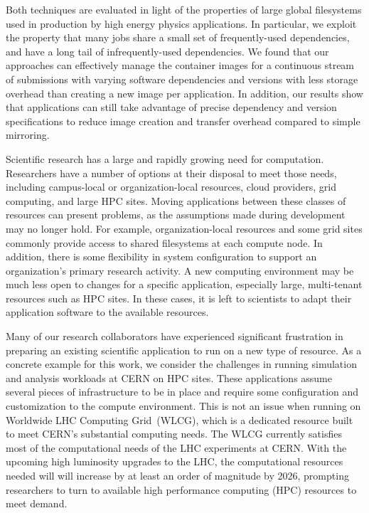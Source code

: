 \documentclass[sigconf]{acmart}
\begin{document}
Both techniques are evaluated in light of the properties
of large global filesystems used in production by high
energy physics applications.  In particular, we exploit the
property that many jobs share a small set of frequently-used
dependencies, and have a long tail of infrequently-used dependencies.
We found that our approaches can effectively manage the container images for a continuous stream of submissions with varying software dependencies and versions with less storage overhead than creating a new image per application.
In addition, our results show that applications can still take advantage of precise dependency and version specifications to reduce image creation and transfer overhead compared to simple mirroring.


Scientific research has a large and rapidly growing need for computation.
Researchers have a number of options at their disposal to meet those needs,
including campus-local or organization-local resources,
cloud providers,
grid computing,
and large HPC sites.
Moving applications between these classes of resources can present problems,
as the assumptions made during development may no longer hold.
For example, organization-local resources and some grid sites commonly provide access to shared filesystems at each compute node.
In addition, there is some flexibility in system configuration to support an organization's primary research activity.
A new computing environment may be much less open to changes for a specific application,
especially large, multi-tenant resources such as HPC sites.
In these cases, it is left to scientists to adapt their application software to the available resources.

Many of our research collaborators have experienced significant frustration in preparing an existing scientific application to run on a new type of resource.
As a concrete example for this work,
we consider the challenges in running simulation and analysis workloads at CERN on HPC sites.
These applications assume several pieces of infrastructure to be in place and require some configuration and customization to the compute environment.
This is not an issue when running on Worldwide LHC Computing Grid~(WLCG),
which is a dedicated resource built to meet CERN's substantial computing needs.
The WLCG currently satisfies most of the computational needs of the LHC experiments at CERN.
With the upcoming high luminosity upgrades to the LHC,
the computational resources needed will will increase by at least an order of magnitude by 2026,
prompting researchers to turn to available high performance computing (HPC) resources to meet demand.
\end{document}
